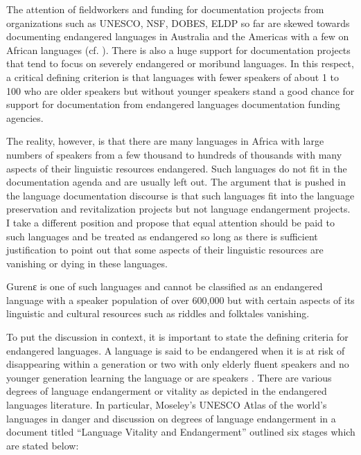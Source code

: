 \documentclass[output=paper,colorlinks,citecolor=brown]{langscibook}
\begin{document}
The attention of fieldworkers and funding for documentation projects from organizations such as UNESCO, NSF, DOBES, ELDP so far are skewed towards documenting endangered languages in Australia and the Americas with a few on African languages (cf. \citealt{EssegbeyEtAl2015}).  There is also a huge support for documentation projects that tend to focus on severely endangered or moribund languages. In this respect, a critical defining criterion is that languages with fewer speakers of about 1 to 100 who are older speakers but without younger speakers stand a good chance for support for documentation from endangered languages documentation funding agencies. 

The reality, however, is that there are many languages in Africa with large numbers of speakers from a few thousand to hundreds of thousands with many aspects of their linguistic resources endangered. Such languages do not fit in the documentation agenda and are usually left out. The argument that is pushed in the language documentation discourse is that such languages fit into the language preservation and revitalization projects but not language endangerment projects. I take a different position and propose that equal attention should be paid to such languages and be treated as endangered so long as there is sufficient justification to point out that some aspects of their linguistic resources are vanishing or dying in these languages. 

Gurenɛ is one of such languages and cannot be classified as an endangered language with a speaker population of over 600,000 but with certain aspects of its linguistic and cultural resources such as riddles and folktales vanishing. 

To put the discussion in context, it is important to state the defining criteria for endangered languages.  A language is said to be endangered when it is at risk of disappearing within a generation or two with only elderly fluent speakers and no younger generation learning the language or are speakers \citet[4]{Thomason2015}. There are various degrees of language endangerment or vitality as depicted in the endangered languages literature. In particular, Moseley’s \citep{Moseley2012} UNESCO Atlas of the world’s languages in danger and  discussion on degrees of language endangerment in a document titled “Language Vitality and Endangerment” outlined six stages which are stated below:

\end{document}
